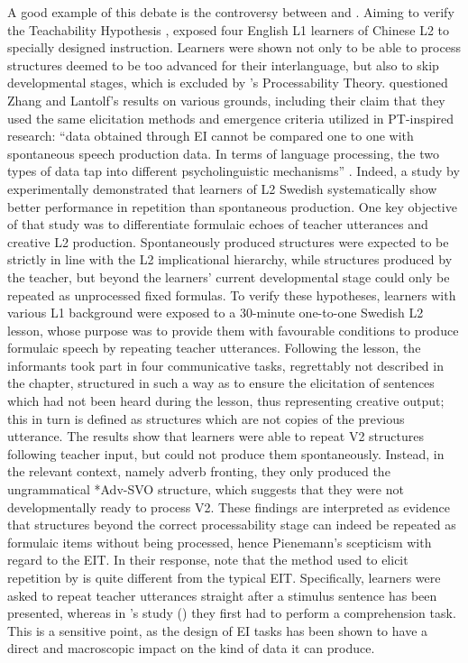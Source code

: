 A good example of this debate is the controversy between \citet{ZhangLantolf2015} and \citet{Pienemann2015}. Aiming to verify the Teachability Hypothesis \citep{Pienemann1984}, \citeauthor{ZhangLantolf2015} exposed four English L1 learners of Chinese L2 to specially designed instruction. Learners were shown not only to be able to process structures deemed to be too advanced for their interlanguage, but also to skip developmental stages, which is excluded by \citeauthor{Pienemann2015}’s Processability Theory. \citet{Pienemann2015} questioned Zhang and Lantolf's results on various grounds, including their claim that they used the same elicitation methods and emergence criteria utilized in PT-inspired research: “data obtained through EI cannot be compared one to one with spontaneous speech production data. In terms of language processing, the two types of data tap into different psycholinguistic mechanisms” \citep[139]{Pienemann2015}. Indeed, a study by \citet{PienemanEtAl2013} experimentally demonstrated that learners of L2 Swedish systematically show better performance in repetition than spontaneous production. One key objective of that study was to differentiate formulaic echoes of teacher utterances and creative L2 production. Spontaneously produced structures were expected to be strictly in line with the L2 implicational hierarchy, while structures produced by the teacher, but beyond the learners’ current developmental stage could only be repeated as unprocessed fixed formulas. To verify these hypotheses, learners with various L1 background were exposed to a 30-minute one-to-one Swedish L2 lesson, whose purpose was to provide them with favourable conditions to produce formulaic speech by repeating teacher utterances. Following the lesson, the informants took part in four communicative tasks, regrettably not described in the chapter, structured in such a way as to ensure the elicitation of sentences which had not been heard during the lesson, thus representing creative output; this in turn is defined as structures which are not copies of the previous utterance. The results show that learners were able to repeat V2 structures following teacher input, but could not produce them spontaneously. Instead, in the relevant context, namely adverb fronting, they only produced the ungrammatical *Adv-SVO structure, which suggests that they were not developmentally ready to process V2. These findings are interpreted as evidence that structures beyond the correct processability stage can indeed be repeated as formulaic items without being processed, hence Pienemann's scepticism with regard to the EIT. In their response, \citet{LantolfZhang2015} note that the method used to elicit repetition by \citet{PienemannEtAl2013} is quite different from the typical EIT. Specifically, learners were asked to repeat teacher utterances straight after a stimulus sentence has been presented, whereas in \citeauthor{LantolfZhang2015}'s study (\citeyear{LantolfZhang2015}) they first had to perform a comprehension task. This is a sensitive point, as the design of EI tasks has been shown to have a direct and macroscopic impact on the kind of data it can produce. 

